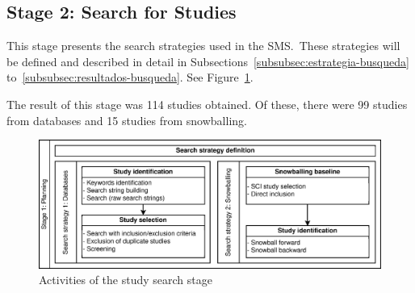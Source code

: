 \newcommand{\totalStudies}{114}
\newcommand{\databaseStudies}{99}
\newcommand{\snowballStudies}{15}
\newcommand{\directInclusionStudies}{0}

\subsection{Stage 2: Search for Studies}

This stage presents the search strategies used in the SMS.~These strategies will be defined and described in detail in Subsections~\ref{subsubsec:estrategia-busqueda} to~\ref{subsubsec:resultados-busqueda}. See Figure~\ref{fig:busqueda-estudios}.

The result of this stage was \totalStudies{} studies obtained. Of these, there were \databaseStudies{} studies from databases and \snowballStudies{} studies from snowballing.

\begin{figure}[ht]
	\centering
	\includegraphics[scale=0.9]{resources/figures/sms-Etapa-1-wide.eps}
	\caption{Activities of the study search stage}
	\label{fig:busqueda-estudios}
\end{figure}








